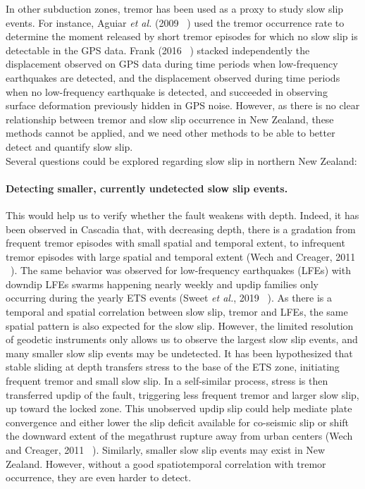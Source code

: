 \documentclass[letterpaper, 12pt]{article}
\begin{document}
In other subduction zones, tremor has been used as a proxy to study slow slip events. For instance, Aguiar \textit{et al.} (2009 ~\cite{AGU_2009}) used the tremor occurrence rate to determine the moment released by short tremor episodes for which no slow slip is detectable in the GPS data. Frank (2016 ~\cite{FRA_2016_GRL}) stacked independently the displacement observed on GPS data during time periods when low-frequency earthquakes are detected, and the displacement observed during time periods when no low-frequency earthquake is detected, and succeeded in observing surface deformation previously hidden in GPS noise. However, as there is no clear relationship between tremor and slow slip occurrence in New Zealand, these methods cannot be applied, and we need other methods to be able to better detect and quantify slow slip.\\

Several questions could be explored regarding slow slip in northern New Zealand:

\paragraph{Detecting smaller, currently undetected slow slip events.} This would help us to verify whether the fault weakens with depth. Indeed, it has been observed in Cascadia that, with decreasing depth, there is a gradation from frequent tremor episodes with small spatial and temporal extent, to infrequent tremor episodes with large spatial and temporal extent (Wech and Creager, 2011 ~\cite{WEC_2011}). The same behavior was observed for low-frequency earthquakes (LFEs) with downdip LFEs swarms happening nearly weekly and updip families only occurring during the yearly ETS events (Sweet \textit{et al.}, 2019 ~\cite{SWE_2019}). As there is a temporal and spatial correlation between slow slip, tremor and LFEs, the same spatial pattern is also expected for the slow slip. However, the limited resolution of geodetic instruments only allows us to observe the largest slow slip events, and many smaller slow slip events may be undetected. It has been hypothesized that stable sliding at depth transfers stress to the base of the ETS zone, initiating frequent tremor and small slow slip. In a self-similar process, stress is then transferred updip of the fault, triggering less frequent tremor and larger slow slip, up toward the locked zone. This unobserved updip slip could help mediate plate convergence and either lower the slip deficit available for co-seismic slip or shift the downward extent of the megathrust rupture away from urban centers (Wech and Creager, 2011 ~\cite{WEC_2011}). Similarly, smaller slow slip events may exist in New Zealand. However, without a good spatiotemporal correlation with tremor occurrence, they are even harder to detect.
\end{document}
